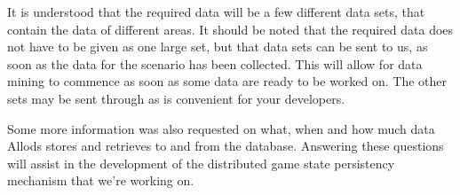 \documentclass[journal,oneside,a4paper,onecolumn]{IEEEtran}
\begin{document}
It is understood that the required data will be a few different data sets, that contain the data of different areas. It should be noted that the
required data does not have to be given as one large set, but that data sets can be sent to us, as soon as the data for the scenario has been
collected. This will allow for data mining to commence as soon as some data are ready to be worked on. The other sets may be sent through as is
convenient for your developers.

Some more information was also requested on what, when and how much data Allods stores and retrieves to and from the database. Answering these
questions will assist in the development of the distributed game state persistency mechanism that we're working on.

\end{document}
